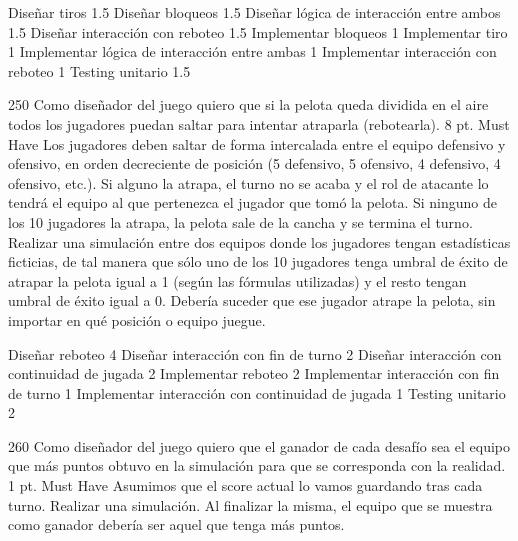 \begin{taskstable}
 \task
 {Diseñar tiros}
 {1.5}
 \task
 {Diseñar bloqueos}
 {1.5}
 \task
 {Diseñar lógica de interacción entre ambos}
 {1.5}
 \task
 {Diseñar interacción con reboteo}
 {1.5}
 \task
 {Implementar bloqueos}
 {1}
 \task
 {Implementar tiro}
 {1}
 \task
 {Implementar lógica de interacción entre ambas}
 {1}
 \task
 {Implementar interacción con reboteo}
 {1}
 \task
 {Testing unitario}
 {1.5}
\end{taskstable}

\vspace{1cm}


\sprintstory
{250}
{Como diseñador del juego quiero que si la pelota queda dividida en el aire todos los jugadores puedan saltar para intentar atraparla (rebotearla).}
{8 pt.}
{Must Have}
{Los jugadores deben saltar de forma intercalada entre el equipo defensivo y ofensivo, en orden decreciente de posición (5 defensivo, 5 ofensivo, 4 defensivo, 4 ofensivo, etc.). Si alguno la atrapa, el turno no se acaba y el rol de atacante lo tendrá el equipo al que pertenezca el jugador que tomó la pelota. Si ninguno de los 10 jugadores la atrapa, la pelota sale de la cancha y se termina el turno.}
{Realizar una simulación entre dos equipos donde los jugadores tengan estadísticas ficticias, de tal manera que sólo uno de los 10 jugadores tenga umbral de éxito de atrapar la pelota igual a 1 (según las fórmulas utilizadas) y el resto tengan umbral de éxito igual a 0. Debería suceder que ese jugador atrape la pelota, sin importar en qué posición o equipo juegue.}

\begin{taskstable}
 \task
 {Diseñar reboteo}
 {4}
 \task
 {Diseñar interacción con fin de turno}
 {2}
 \task
 {Diseñar interacción con continuidad de jugada}
 {2}
 \task
 {Implementar reboteo}
 {2}
 \task
 {Implementar interacción con fin de turno}
 {1}
 \task
 {Implementar interacción con continuidad de jugada}
 {1}
 \task
 {Testing unitario}
 {2}
\end{taskstable}

\vspace{1cm}


\sprintstory
{260}
{Como diseñador del juego quiero que el ganador de cada desafío sea el equipo que más puntos obtuvo en la simulación para que se corresponda con la realidad.}
{1 pt.}
{Must Have}
{Asumimos que el score actual lo vamos guardando tras cada turno.}
{Realizar una simulación. Al finalizar la misma, el equipo que se muestra como ganador debería ser aquel que tenga más puntos.}


